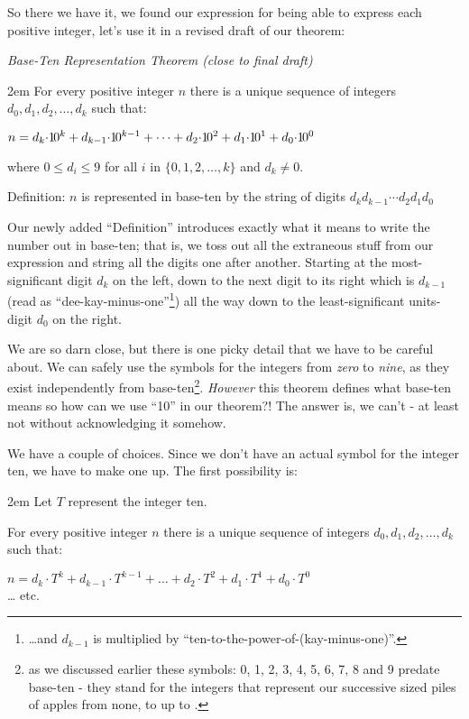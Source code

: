 \documentclass{article}
\newenvironment{jprIn}{\begin{adjustwidth}{2em}{}}{\end{adjustwidth}}
\begin{document}
So there we have it, we found our expression for being able to
express each positive integer, let's use
it in a revised draft of our theorem:

\emph{Base-Ten Representation Theorem (close to final draft)}
\begin{jprIn}
For every positive integer $n$ there is a unique sequence
of integers $d_0, d_1, d_2,\dots{},d_k$ such that:

\hspace{3em}$n=d_k{\cdot}{1\hspace{-0.12em}0}^k+d_{k-1}{\cdot}{1\hspace{-0.12em}0}^{k-1}+\dots+d_2{\cdot}{1\hspace{-0.12em}0}^2+d_1{\cdot}{1\hspace{-0.12em}0}^1+d_0{\cdot}{1\hspace{-0.12em}0}^0$

where $0\le{}d_i\le{}9$ for all $i$ in $\{0,1,2,\dots{},k\}$ and $d_k\ne0$.

Definition: $n$ is represented in base-ten by the string of digits $d_kd_{k-1}{\cdots}d_2d_1d_0$
\end{jprIn}

Our newly added ``Definition'' introduces exactly what it means to write
the number out in base-ten; that is,
we toss out all the extraneous stuff from our expression
and string all the digits one after another.
Starting at the most-significant digit $d_k$ on the left,
down to the next digit to its right which is $d_{k-1}$
(read as ``dee-kay-minus-one''\footnote{\dots{}and $d_{k-1}$ is
multiplied by ``ten-to-the-power-of-(kay-minus-one)''.})
all the way down to the least-significant units-digit $d_0$ on the right.

We are so darn close, but there is one picky detail that we have to be careful about.
We can safely use the symbols for the integers from \emph{zero} to \emph{nine},
as they exist independently from base-ten\footnote{as we discussed earlier
these symbols: 0, 1, 2, 3, 4, 5, 6, 7, 8 and 9 predate base-ten - they
stand for the integers that represent our successive
sized piles of apples from none, to \faApple{} up
to \faApple{}\faApple{}\faApple{}\faApple{}\faApple{}\faApple{}\faApple{}\faApple{}\faApple{}.}.
\emph{However} this theorem defines what base-ten means so how can we
use ``10'' in our theorem?!  The answer is, we can't - at 
least not without acknowledging it somehow.

We have a couple of choices.
Since we don't have an actual symbol for the integer ten,
we have to make one up. The first possibility is:
\begin{jprIn}
Let $T$ represent the integer ten.

For every positive integer $n$ there is a unique sequence
of integers $d_0, d_1, d_2,\dots{},d_k$ such that:

\hspace{3em}$n=d_k{\cdot}{T}^k+d_{k-1}{\cdot}{T}^{k-1}+\dots+d_2{\cdot}{T}^2+d_1{\cdot}{T}^1+d_0{\cdot}{T}^0$\\
\dots{} etc.
\end{jprIn}
\end{document}
